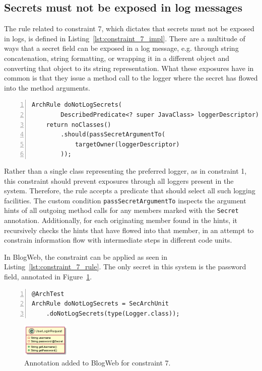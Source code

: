 \subsection{Secrets must not be exposed in log messages}
The rule related to constraint 7, which dictates that secrets must not be exposed in logs, is defined in Listing~\ref{lst:constraint_7_impl}.
There are a multitude of ways that a secret field can be exposed in a log message, e.g. through string concatenation, string formatting, or wrapping it in a different object and converting that object to its string representation. What these exposures have in common is that they issue a method call to the logger where the secret has flowed into the method arguments.

\begin{minipage}{\linewidth}
\begin{lstlisting}[caption={Rule definition for constraint 7.}, captionpos=b, label=lst:constraint_7_impl, numbers=left]
ArchRule doNotLogSecrets(
        DescribedPredicate<? super JavaClass> loggerDescriptor) {
    return noClasses()
        .should(passSecretArgumentTo(
            targetOwner(loggerDescriptor)
        ));
\end{lstlisting}
\end{minipage}

Rather than a single class representing the preferred logger, as in constraint 1, this constraint should prevent exposures through all loggers present in the system. Therefore, the rule accepts a predicate that should select all such logging facilities. The custom condition \texttt{passSecretArgumentTo} inspects the argument hints of all outgoing method calls for any members marked with the \texttt{Secret} annotation. Additionally, for each originating member found in the hints, it recursively checks the hints that have flowed into that member, in an attempt to constrain information flow with intermediate steps in different code units.

In BlogWeb, the constraint can be applied as seen in Listing~\ref{lst:constraint_7_rule}. The only secret in this system is the password field, annotated in Figure~\ref{fig:secrets_toy_system}.

\begin{minipage}{\linewidth}
\begin{lstlisting}[caption={Application of constraint 7 to BlogWeb.}, captionpos=b, label=lst:constraint_7_rule, numbers=left]
@ArchTest
ArchRule doNotLogSecrets = SecArchUnit
    .doNotLogSecrets(type(Logger.class));
\end{lstlisting}
\end{minipage}

\begin{figure}
    \centering
    \includegraphics[width=0.2\textwidth]{figure/toyexamples/Secrets.png}
    \caption{Annotation added to BlogWeb for constraint 7.}
    \label{fig:secrets_toy_system}
\end{figure}